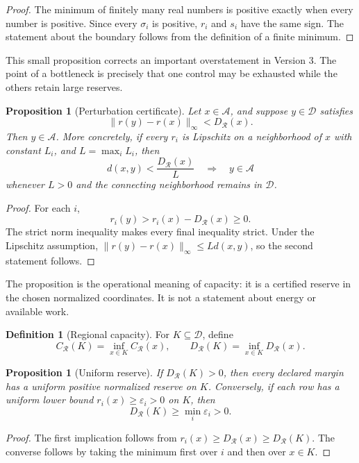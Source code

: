 \documentclass[11pt]{article}
\newtheorem{proposition}[theorem]{Proposition}
\theoremstyle{definition}
\newtheorem{definition}[theorem]{Definition}
\theoremstyle{remark}
\newcommand{\cA}{\mathcal A}
\newcommand{\cD}{\mathcal D}
\newcommand{\cR}{\mathcal R}
\begin{document}
\begin{proof}
The minimum of finitely many real numbers is positive exactly when every
number is positive.  Since every \(\sigma_i\) is positive,
\(r_i\) and \(s_i\) have the same sign.  The statement about the boundary
follows from the definition of a finite minimum.
\end{proof}

This small proposition corrects an important overstatement in Version 3.
The point of a bottleneck is precisely that one control may be exhausted
while the others retain large reserves.

\begin{proposition}[Perturbation certificate]
\label{prop:perturb}
Let \(x\in\cA\), and suppose \(y\in\cD\) satisfies
\[
 \|r(y)-r(x)\|_{\infty}<D_{\cR}(x).
\]
Then \(y\in\cA\).  More concretely, if every \(r_i\) is Lipschitz on a
neighborhood of \(x\) with constant \(L_i\), and
\(L=\max_iL_i\), then
\[
 d(x,y)<\frac{D_{\cR}(x)}{L}
 \quad\Longrightarrow\quad
 y\in\cA
\]
whenever \(L>0\) and the connecting neighborhood remains in \(\cD\).
\end{proposition}

\begin{proof}
For each \(i\),
\[
 r_i(y)
 >
 r_i(x)-D_{\cR}(x)
 \ge 0.
\]
The strict norm inequality makes every final inequality strict.  Under the
Lipschitz assumption,
\(\|r(y)-r(x)\|_\infty\le Ld(x,y)\), so the second statement follows.
\end{proof}

The proposition is the operational meaning of capacity: it is a certified
reserve in the chosen normalized coordinates.  It is not a statement about
energy or available work.

\begin{definition}[Regional capacity]
For \(K\subseteq\cD\), define
\[
 C_{\cR}(K)=\inf_{x\in K}C_{\cR}(x),
 \qquad
 D_{\cR}(K)=\inf_{x\in K}D_{\cR}(x).
\]
\end{definition}

\begin{proposition}[Uniform reserve]
\label{prop:uniform}
If \(D_{\cR}(K)>0\), then every declared margin has a uniform positive
normalized reserve on \(K\).  Conversely, if each row has a uniform lower
bound \(r_i(x)\ge\varepsilon_i>0\) on \(K\), then
\[
 D_{\cR}(K)\ge\min_i\varepsilon_i>0.
\]
\end{proposition}

\begin{proof}
The first implication follows from
\(r_i(x)\ge D_{\cR}(x)\ge D_{\cR}(K)\).  The converse follows by taking the
minimum first over \(i\) and then over \(x\in K\).
\end{proof}
\end{document}
